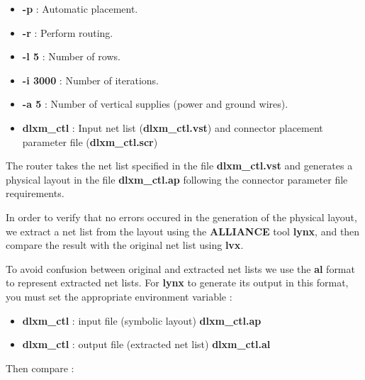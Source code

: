 \begin {itemize}
\item {\bf -p} : Automatic placement.
\item {\bf -r} : Perform routing.
\item {\bf -l 5} : Number of rows.
\item {\bf -i 3000} : Number of iterations.
\item {\bf -a 5} : Number of vertical supplies (power and ground
wires).
\item {\bf dlxm\_ctl} : Input net list ({\bf dlxm\_ctl.vst})
and connector placement parameter file ({\bf dlxm\_ctl.scr})
\end{itemize}

The router takes the net list specified in the file {\bf
dlxm\_ctl.vst} and generates a physical layout in the file {\bf
dlxm\_ctl.ap} following the connector
parameter file requirements.

In order to verify that no errors occured in the generation of the physical layout, we extract a net list from the layout using the {\bf ALLIANCE} tool {\bf lynx}, and then compare the result with the original net list using {\bf lvx}. 

To avoid confusion between original and extracted net lists we use the {\bf al} format to represent extracted net lists. For {\bf lynx} to generate its output in this format, you must set the appropriate environment variable :


\begin{itemize}
\item
{\bf dlxm\_ctl} : input file (symbolic layout) {\bf dlxm\_ctl.ap}
\item
{\bf dlxm\_ctl} : output file (extracted net list) {\bf dlxm\_ctl.al}
\end{itemize}

Then compare :


